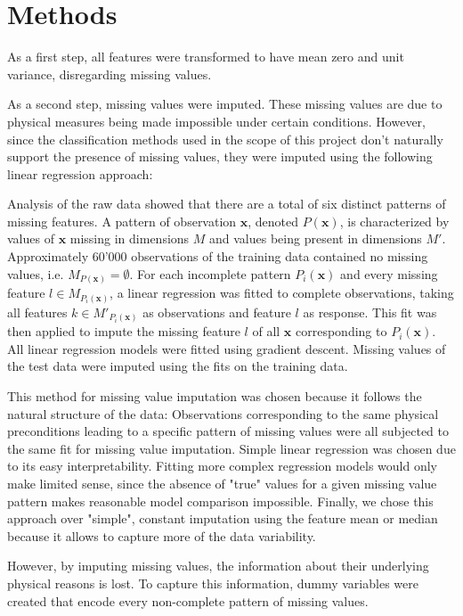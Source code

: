 \documentclass[10pt,conference,compsocconf]{IEEEtran}
\begin{document}
\section*{Methods}
As a first step, all features were transformed to have mean zero and unit variance, disregarding missing values.
\par 
As a second step, missing values were imputed. These missing values are due to physical measures being made impossible under certain conditions. However, since the classification methods used in the scope of this project don't naturally support the presence of missing values, they were imputed using the following linear regression approach: 
\par
Analysis of the raw data showed that there are a total of six distinct patterns of missing features. A pattern of observation $\boldsymbol{x}$, denoted $P(\boldsymbol{x})$, is characterized by values of $\boldsymbol{x}$ missing in dimensions $M$ and values being present in dimensions $M'$. Approximately 60'000 observations of the training data contained no missing values, i.e. $M_{P(\boldsymbol{x})} = \emptyset$. For each incomplete pattern $P_i(\boldsymbol{x})$ and every missing feature $l \in M_{P_i(\boldsymbol{x})}$, a linear regression was fitted to complete observations, taking all features $k \in M'_{P_i(\boldsymbol{x})}$ as observations and feature $l$ as response. This fit was then applied to impute the missing feature $l$ of all $\boldsymbol{x}$ corresponding to $P_i(\boldsymbol{x})$. All linear regression models were fitted using gradient descent. Missing values of the test data were imputed using the fits on the training data.  
\par
This method for missing value imputation was chosen because it follows the natural structure of the data: Observations corresponding to the same physical preconditions leading to a specific pattern of missing values were all subjected to the same fit for missing value imputation. Simple linear regression was chosen due to its easy interpretability. Fitting more complex regression models would only make limited sense, since the absence of "true" values for a given missing value pattern makes reasonable model comparison impossible. Finally, we chose this approach over "simple", constant imputation using the feature mean or median because it allows to capture more of the data variability. 
\par
However, by imputing missing values, the information about their underlying physical reasons is lost. To capture this information, dummy variables were created that encode every non-complete pattern of missing values. 
\end{document}
